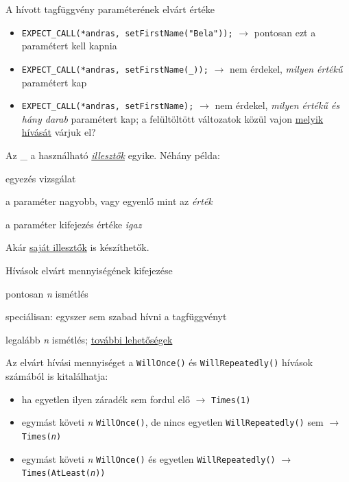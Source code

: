 \documentclass[usenames,dvipsnames,aspectratio=169]{beamer}
\newcommand{\hiv}[1]{{\color{hivatkozasszin}#1}}
\begin{document}
\begin{frame}
    A hívott tagfüggvény paraméterének elvárt értéke
    \begin{itemize}
        \item \texttt{EXPECT\_CALL(*andras, setFirstName("Bela"));} $\to$ pontosan ezt a paramétert kell kapnia
        \item \texttt{EXPECT\_CALL(*andras, setFirstName(\_));} $\to$ nem érdekel, \emph{milyen értékű} paramétert kap
        \item \texttt{EXPECT\_CALL(*andras, setFirstName);} $\to$ nem érdekel, \emph{milyen értékű és hány darab} paramétert kap; 
        a felültöltött változatok közül vajon \hiv{\href{https://google.github.io/googletest/gmock\_cook\_book.html\#SelectOverload}{melyik hívását}} várjuk el?
    \end{itemize}
    Az \_ a használható \hiv{\href{https://google.github.io/googletest/reference/matchers.html\#wildcard}{\emph{illesztők}}} egyike. Néhány példa:
    \begin{description}[mm]
        \item[\texttt{Eq(\emph{érték})}] egyezés vizsgálat 
        \item[\texttt{Ge(\emph{érték})}] a paraméter nagyobb, vagy egyenlő mint az \emph{érték}
        \item[\texttt{IsTrue()}] a paraméter kifejezés értéke \emph{igaz}
    \end{description}
    Akár \hiv{\href{https://google.github.io/googletest/gmock\_cook\_book.html\#NewMatchers}{saját illesztők}} is készíthetők.
\end{frame}

\begin{frame}
    Hívások elvárt mennyiségének kifejezése
    \begin{description}[mm]
        \item[\texttt{Times(\emph{n})}] pontosan \emph{n} ismétlés
        \item[\texttt{Times(0)}] speciálisan: egyszer sem szabad hívni a tagfüggvényt
        \item[\texttt{Times(AtLeast(\emph{n}))}] legalább \emph{n} ismétlés; \hiv{\href{https://google.github.io/googletest/reference/mocking.html\#EXPECT\_CALL.Times}{további lehetőségek}}
    \end{description}
    Az elvárt hívási mennyiséget a \texttt{WillOnce()} és \texttt{WillRepeatedly()} hívások számából is kitalálhatja:
    \begin{itemize}
        \item ha egyetlen ilyen záradék sem fordul elő $\to$ \texttt{Times(1)}
        \item egymást követi \emph{n} \texttt{WillOnce()}, de nincs egyetlen \texttt{WillRepeatedly()} sem $\to$ \texttt{Times(\emph{n})}
        \item egymást követi \emph{n} \texttt{WillOnce()} és egyetlen \texttt{WillRepeatedly()} $\to$ \texttt{Times(AtLeast(\emph{n}))}
    \end{itemize}
\end{frame}
\end{document}
